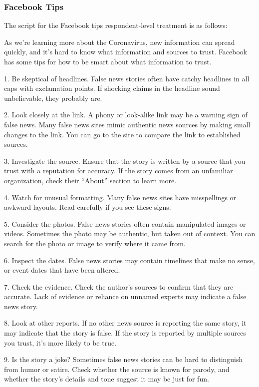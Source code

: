 \documentclass[letterpaper, 12pt, parskip=full,DIV=10]{scrartcl}
\begin{document}
\subsubsection{Facebook Tips}\label{sec:fbtips}
The script for the Facebook tips respondent-level treatment is as follows:

As we're learning more about the Coronavirus, new information can spread quickly, and it's hard to know what information and sources to trust. Facebook has some tips for how to be smart about what information to trust. 

1. Be skeptical of headlines. False news stories often have catchy headlines in all caps with exclamation points. If shocking claims in the headline sound unbelievable, they probably are.

2. Look closely at the link. A phony or look-alike link may be a warning sign of false news. Many false news sites mimic authentic news sources by making small changes to the link. You can go to the site to compare the link to established sources.

3. Investigate the source. Ensure that the story is written by a source that you trust with a reputation for accuracy. If the story comes from an unfamiliar organization, check their ``About'' section to learn more.

4. Watch for unusual formatting. Many false news sites have misspellings or awkward layouts. Read carefully if you see these signs.

5. Consider the photos. False news stories often contain manipulated images or videos. Sometimes the photo may be authentic, but taken out of context. You can search for the photo or image to verify where it came from.

6. Inspect the dates. False news stories may contain timelines that make no sense, or event dates that have been altered.

7. Check the evidence. Check the author's sources to confirm that they are accurate. Lack of evidence or reliance on unnamed experts may indicate a false news story.

8. Look at other reports. If no other news source is reporting the same story, it may indicate that the story is false. If the story is reported by multiple sources you trust, it's more likely to be true.

9. Is the story a joke? Sometimes false news stories can be hard to distinguish from humor or satire. Check whether the source is known for parody, and whether the story's details and tone suggest it may be just for fun.
\end{document}

